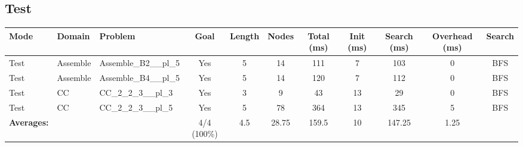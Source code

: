 \documentclass{article}
\begin{document}
\subsection*{Test}
\begin{tabular}{lllcccccccc}
\toprule
Mode & Domain & Problem & Goal & Length & Nodes & Total (ms) & Init (ms) & Search (ms) & Overhead (ms) & Search \\
\midrule
Test & Assemble & Assemble\_B2\_\_pl\_5 & Yes & 5 & 14 & 111 & 7 & 103 & 0 & BFS \\
Test & Assemble & Assemble\_B4\_\_pl\_5 & Yes & 5 & 14 & 120 & 7 & 112 & 0 & BFS \\
Test & CC & CC\_2\_2\_3\_\_pl\_3 & Yes & 3 & 9 & 43 & 13 & 29 & 0 & BFS \\
Test & CC & CC\_2\_2\_3\_\_pl\_5 & Yes & 5 & 78 & 364 & 13 & 345 & 5 & BFS \\
\textbf{Averages:} & & & 4/4 (100\%) & 4.5 & 28.75 & 159.5 & 10 & 147.25 & 1.25 & \\
\bottomrule
\end{tabular}
\newpage
\end{document}
